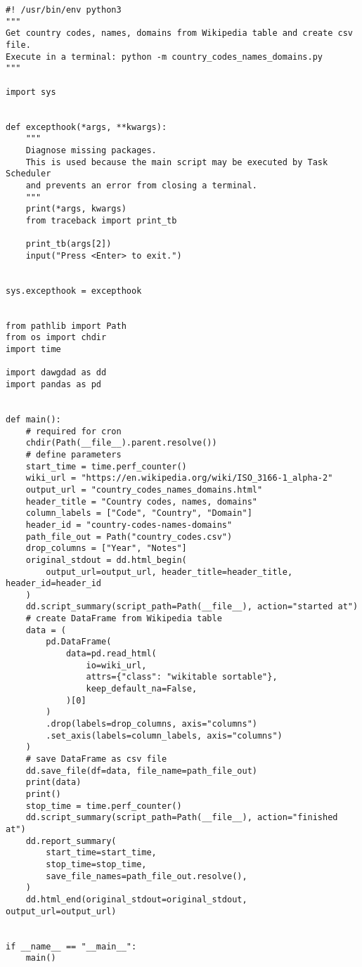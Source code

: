 \documentclass[10pt, letterpaper, twoside]{article}
\begin{document}
\begin{footnotesize}
\begin{verbatim}
#! /usr/bin/env python3
"""
Get country codes, names, domains from Wikipedia table and create csv file.
Execute in a terminal: python -m country_codes_names_domains.py
"""

import sys


def excepthook(*args, **kwargs):
    """
    Diagnose missing packages.
    This is used because the main script may be executed by Task Scheduler
    and prevents an error from closing a terminal.
    """
    print(*args, kwargs)
    from traceback import print_tb

    print_tb(args[2])
    input("Press <Enter> to exit.")


sys.excepthook = excepthook


from pathlib import Path
from os import chdir
import time

import dawgdad as dd
import pandas as pd


def main():
    # required for cron
    chdir(Path(__file__).parent.resolve())
    # define parameters
    start_time = time.perf_counter()
    wiki_url = "https://en.wikipedia.org/wiki/ISO_3166-1_alpha-2"
    output_url = "country_codes_names_domains.html"
    header_title = "Country codes, names, domains"
    column_labels = ["Code", "Country", "Domain"]
    header_id = "country-codes-names-domains"
    path_file_out = Path("country_codes.csv")
    drop_columns = ["Year", "Notes"]
    original_stdout = dd.html_begin(
        output_url=output_url, header_title=header_title, header_id=header_id
    )
    dd.script_summary(script_path=Path(__file__), action="started at")
    # create DataFrame from Wikipedia table
    data = (
        pd.DataFrame(
            data=pd.read_html(
                io=wiki_url,
                attrs={"class": "wikitable sortable"},
                keep_default_na=False,
            )[0]
        )
        .drop(labels=drop_columns, axis="columns")
        .set_axis(labels=column_labels, axis="columns")
    )
    # save DataFrame as csv file
    dd.save_file(df=data, file_name=path_file_out)
    print(data)
    print()
    stop_time = time.perf_counter()
    dd.script_summary(script_path=Path(__file__), action="finished at")
    dd.report_summary(
        start_time=start_time,
        stop_time=stop_time,
        save_file_names=path_file_out.resolve(),
    )
    dd.html_end(original_stdout=original_stdout, output_url=output_url)


if __name__ == "__main__":
    main()
\end{verbatim}
\end{footnotesize}
\newpage
\end{document}
